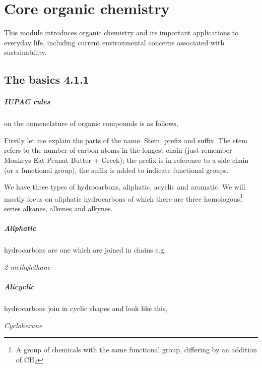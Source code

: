 
\chapter{Core organic chemistry}
This module introduces organic chemistry and its important applications to everyday life, including current environmental concerns associated with sustainability.

\section{The basics 4.1.1}

	\paragraph{IUPAC rules} on the nomenclature of organic compounds is as follows,
		
	Firstly let me explain the parts of the name. Stem, prefix and suffix. The stem refers to the number of carbon atoms in the longest chain (just remember Monkeys Eat Peanut Butter + Greek); the prefix is in reference to a side chain (or a functional group); the suffix is added to indicate functional groups.
	
	We have three types of hydrocarbons, aliphatic, acyclic and aromatic. We will mostly focus on aliphatic hydrocarbons of which there are three homologous\footnote{A group of chemicals with the same functional group, differing by an addition of CH$_2$} series alkanes, alkenes and alkynes.
	
	\paragraph{Aliphatic} hydrocarbons are one which are joined in chains e.g,
	\begin{center}
		
		\textit{2-methylethane}
	\end{center}
	
	\begin{samepage}
	\paragraph{Alicyclic} hydrocarbons join in cyclic shapes and look like this,
	\begin{center}
		
		\textit{Cyclohexane}
	\end{center}
	\end{samepage}
	
